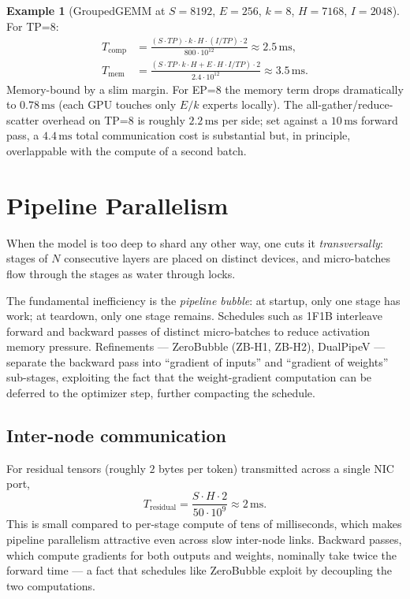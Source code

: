\documentclass[11pt,a4paper]{article}
\theoremstyle{definition}
\newtheorem{example}[definition]{Example}
\theoremstyle{remark}
\theoremstyle{plain}
\newcommand{\ms}{\,\text{ms}}
\begin{document}
\begin{example}[GroupedGEMM at $S=8192$, $E=256$, $k=8$, $H=7168$, $I=2048$]
For TP=8:
\begin{align}
T_{\text{comp}} &= \frac{(S \cdot TP) \cdot k \cdot H \cdot (I/TP) \cdot 2}{800 \cdot 10^{12}} \approx 2.5\ms, \\
T_{\text{mem}}  &= \frac{(S \cdot TP \cdot k \cdot H + E \cdot H \cdot I / TP) \cdot 2}{2.4 \cdot 10^{12}} \approx 3.5\ms.
\end{align}
Memory-bound by a slim margin.
For EP=8 the memory term drops dramatically to $0.78\ms$ (each GPU touches only $E/k$ experts locally). The all-gather/reduce-scatter overhead on TP=8 is roughly $2.2\ms$ per side; set against a $10\ms$ forward pass, a $4.4\ms$ total communication cost is substantial but, in principle, overlappable with the compute of a second batch.
\end{example}

\section{Pipeline Parallelism}
\label{sec:pipeline}

When the model is too deep to shard any other way, one cuts it \emph{transversally}: stages of $N$ consecutive layers are placed on distinct devices, and micro-batches flow through the stages as water through locks.



The fundamental inefficiency is the \emph{pipeline bubble}: at startup, only one stage has work; at teardown, only one stage remains. Schedules such as 1F1B interleave forward and backward passes of distinct micro-batches to reduce activation memory pressure. Refinements --- ZeroBubble (ZB-H1, ZB-H2), DualPipeV --- separate the backward pass into ``gradient of inputs'' and ``gradient of weights'' sub-stages, exploiting the fact that the weight-gradient computation can be deferred to the optimizer step, further compacting the schedule.

\subsection{Inter-node communication}

For residual tensors (roughly $2$ bytes per token) transmitted across a single NIC port,
\begin{equation}
T_{\text{residual}} = \frac{S \cdot H \cdot 2}{50 \cdot 10^{9}} \approx 2\ms.
\end{equation}
This is small compared to per-stage compute of tens of milliseconds, which makes pipeline parallelism attractive even across slow inter-node links. Backward passes, which compute gradients for both outputs and weights, nominally take twice the forward time --- a fact that schedules like ZeroBubble exploit by decoupling the two computations.
\end{document}
